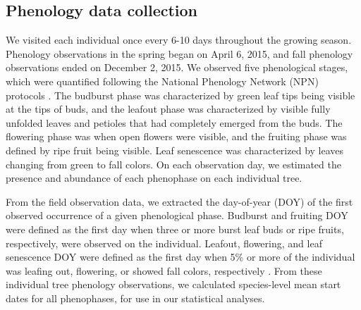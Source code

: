 \documentclass{article}
\begin{document}
\subsection*{Phenology data collection}
We visited each individual once every 6-10 days throughout the growing season. Phenology observations in the spring began on April 6, 2015, and fall phenology observations ended on December 2, 2015. We observed five phenological stages, which were quantified following the National Phenology Network (NPN) protocols \citep[for a full description see][]{denny2014}. The budburst phase was characterized by green leaf tips being visible at the tips of buds, and the leafout phase was characterized by visible fully unfolded leaves and petioles that had completely emerged from the buds. %
The flowering phase was when open flowers were visible, and the fruiting phase was defined by ripe fruit being visible. Leaf senescence was characterized by leaves changing from green to fall colors. On each observation day, we estimated the presence and abundance of each phenophase on each individual tree.
\par From the field observation data, we extracted the day-of-year (DOY) of the first observed occurrence of a given phenological phase. Budburst and fruiting DOY were defined as the first day when three or more burst leaf buds or ripe fruits, respectively, were observed on the individual. Leafout, flowering, and leaf senescence DOY were defined as the first day when 5\% or more of the individual was leafing out,  flowering, or showed fall colors, respectively \citep{denny2014}. 
From these individual tree phenology observations, we calculated species-level mean start dates for all phenophases, for use in our statistical analyses. 
\end{document}
